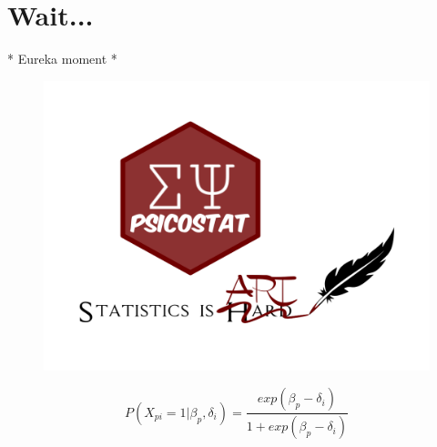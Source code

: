 \documentclass{beamer}
\begin{document}
\section{Wait...}

\begin{frame}
\begin{center}
	* Eureka moment *
\end{center}

\begin{figure}
	\centering
	\includegraphics[width=0.6\linewidth]{psicostat}
\end{figure}

\begin{equation*}
	P(X_{pi} = 1|\beta_p, \delta_i) = \dfrac{exp(\beta_p - \delta_i)}{1 + exp(\beta_p - \delta_i)}
\end{equation*}

\end{frame}
\end{document}
